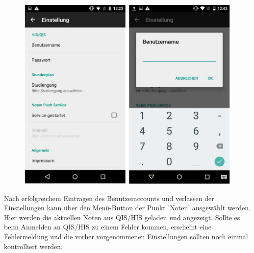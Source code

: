 \begin{figure}[h]
	\centering
	\includegraphics[scale=0.5]{03_Bedienungsanleitung/img/einstellungen.jpg}
\end{figure}




\newpage

Nach erfolgreichem Eintragen des Benutzeraccounts und verlassen der Einstellungen kann über den Menü-Button der Punkt 'Noten' ausgewählt werden. Hier werden die aktuellen Noten aus QIS/HIS geladen und angezeigt. Sollte es beim Anmelden an QIS/HIS zu einem Fehler kommen, erscheint eine Fehlermeldung und die vorher vorgenommenen Einstellungen sollten noch einmal kontrolliert werden. 

